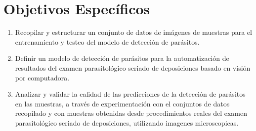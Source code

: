 \documentclass[letter,12pt]{report}
\begin{document}
\section{Objetivos Específicos}
\begin{enumerate}\justifying
    \item Recopilar y estructurar un conjunto de datos de imágenes de muestras para el entrenamiento y testeo del modelo de detección de parásitos.
  \item Definir un modelo de detección de parásitos para la automatización de resultados del examen parasitológico seriado de deposiciones basado en visión por computadora.
  \item Analizar y validar la calidad de las predicciones de la detección de parásitos en las muestras, a través de experimentación con el conjuntos de datos recopilado y con muestras obtenidas desde procedimientos reales del examen parasitológico seriado de deposiciones, utilizando imagenes microscopicas.
\end{enumerate}

%
\end{document}
